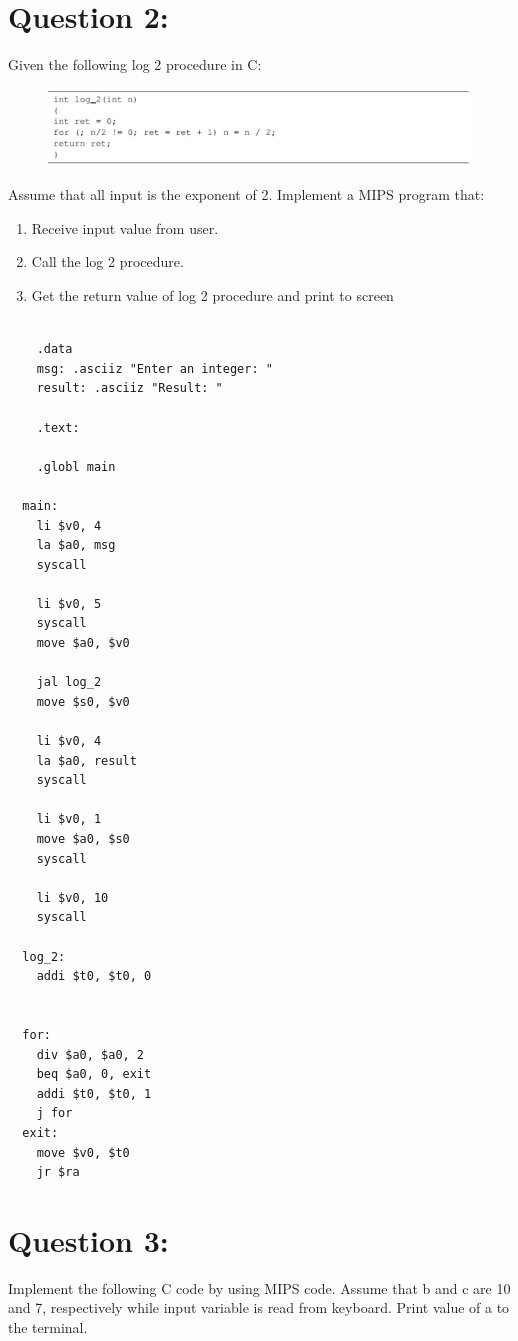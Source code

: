 \documentclass[12pt,a4paper]{article}
\begin{document}
\section*{Question 2:} Given the following log 2 procedure in C:
\begin{figure}[h]
  \centering
  \includegraphics[scale=1.4]{log2.PNG}
\end{figure}

Assume that all input is the exponent of 2. Implement a MIPS program that:
\begin{enumerate}
  \item Receive input value from user.
  \item Call the log 2 procedure.
  \item Get the return value of log 2 procedure and print to screen
\end{enumerate}

\begin{mdframed}[hidealllines=true,backgroundcolor=magenta!10]
  \begin{lstlisting}

    .data
    msg: .asciiz "Enter an integer: "
    result: .asciiz "Result: "

    .text:

    .globl main

  main:
    li $v0, 4
    la $a0, msg
    syscall

    li $v0, 5
    syscall
    move $a0, $v0

    jal log_2
    move $s0, $v0

    li $v0, 4
    la $a0, result
    syscall

    li $v0, 1
    move $a0, $s0
    syscall

    li $v0, 10
    syscall

  log_2:
    addi $t0, $t0, 0


  for:
    div $a0, $a0, 2
    beq $a0, 0, exit
    addi $t0, $t0, 1
    j for
  exit:
    move $v0, $t0
    jr $ra

  \end{lstlisting}
\end{mdframed}


\section*{Question 3:}Implement the following C code by using MIPS code. Assume that b and c are 10 and 7, respectively while input variable is read from keyboard. Print value of a to the terminal.
\end{document}
